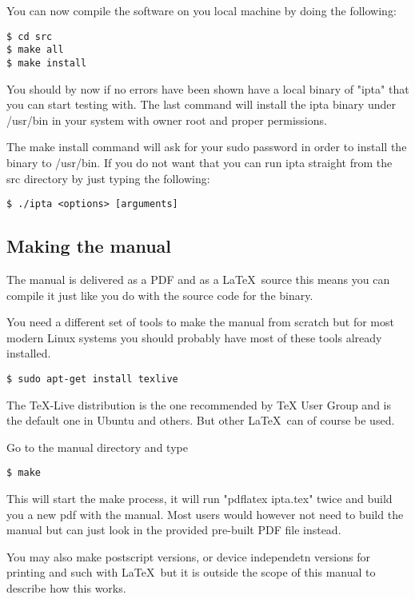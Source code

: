 \documentclass[english,twoside,openright,a4paper,12pt]{article}
\begin{document}
You can now compile the software on you local machine by doing the following:

\begin{verbatim}
$ cd src 
$ make all 
$ make install
\end{verbatim}

You should by now if no errors have been shown have a local binary of
"ipta" that you can start testing with. The last command will install
the ipta binary under /usr/bin in your system with owner root and
proper permissions.

The make install command will ask for your sudo password in order to
install the binary to /usr/bin. If you do not want that you can run
ipta straight from the src directory by just typing the following:

\begin{verbatim}
$ ./ipta <options> [arguments]
\end{verbatim}

\subsection{Making the manual}

The manual is delivered as a PDF and as a \LaTeX\ source this means
you can compile it just like you do with the source code for the
binary.

You need a different set of tools to make the manual from scratch but
for most modern Linux systems you should probably have most of these
tools already installed.

\begin{verbatim}
$ sudo apt-get install texlive
\end{verbatim}

The TeX-Live distribution is the one recommended by TeX User Group and
is the default one in Ubuntu and others. But other \LaTeX\ can of
course be used.

Go to the manual directory and type

\begin{verbatim}
$ make
\end{verbatim}

This will start the make process, it will run "pdflatex ipta.tex"
twice and build you a new pdf with the manual. Most users would
however not need to build the manual but can just look in the provided
pre-built PDF file instead.

You may also make postscript versions, or device independetn versions
for printing and such with \LaTeX\ but it is outside the scope of this
manual to describe how this works.
\end{document}
